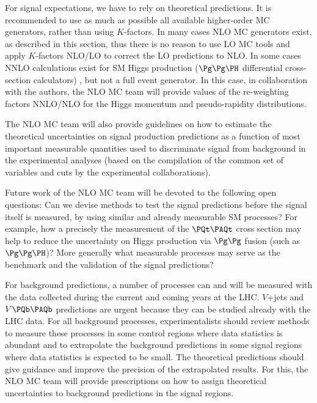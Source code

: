 For signal expectations, we have to rely on theoretical predictions.
It is recommended to use as much as possible all available higher-order MC generators, 
rather than using $K$-factors. 
In many cases NLO MC generators exist, as described in this section, thus there is 
no reason to use LO MC tools and apply $K$-factors NLO/LO to correct the 
LO predictions to NLO.
In some cases NNLO calculations exist for SM Higgs production ($\Pg\Pg\PH$ differential cross-section 
calculators) 
, but not a full event generator. 
In this case, in collaboration with the authors, the NLO MC team will provide values of 
the re-weighting factors NNLO/NLO for the Higgs momentum and pseudo-rapidity distributions.

The NLO MC team will also provide guidelines on how to estimate the theoretical uncertainties 
on signal production predictions as a function of most important measurable quantities 
used to discriminate signal from background in the experimental analyses (based on 
the compilation of the common set of variables and cuts by the experimental collaborations).

Future work of the NLO MC team will be devoted to the following open questions: 
Can we devise methods to test the signal predictions before the signal itself is measured, 
by using similar and already measurable SM processes? 
For example, how a precisely the measurement of the $\PQt\PAQt$ cross section 
may help to 
reduce the uncertainty on Higgs production via $\Pg\Pg$ fusion (such as 
$\Pg\Pg\PH$)? 
More generally what measurable processes may serve as the benchmark and 
the validation of the signal predictions?

For background predictions, a number of processes can and will be measured with the 
data collected during the current and coming years at the LHC.  
$V$+jets and $V\PQb\PAQb$ predictions are urgent because they can be studied already with the LHC data. 
For all background processes, experimentalists should review methods to measure 
these processes in some control regions where data statistics is abundant and 
to extrapolate the background predictions in some signal regions where data statistics 
is expected to be small. 
The theoretical predictions should give guidance and improve the precision of 
the extrapolated results.
For this, the NLO MC team will provide prescriptions on how to assign theoretical 
uncertainties to background predictions in the signal regions.


